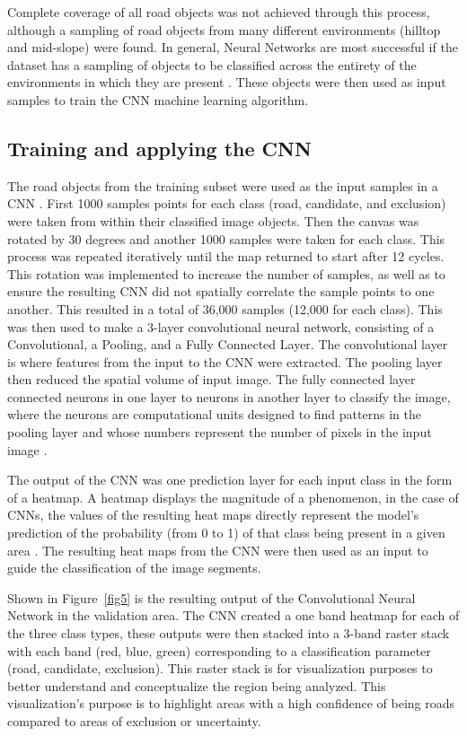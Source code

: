 \documentclass[remotesensing,article,submit,pdftex,moreauthors]{Definitions/mdpi}
\begin{document}
Complete coverage of all road objects was not achieved through this process, although a sampling of road objects from many different environments (hilltop and mid-slope) were found.  In general, Neural Networks are most successful if the dataset has a sampling of objects to be classified across the entirety of the environments in which they are present \cite{prakash}. These objects were then used as input samples to train the CNN machine learning algorithm.  

\subsection{Training and applying the CNN}
The road objects from the training subset were used as the input samples in a CNN \cite{ecogcnn}. First 1000 samples points for each class (road, candidate, and exclusion) were taken from within their classified image objects. Then the canvas was rotated by 30 degrees and another 1000 samples were taken for each class. This process was repeated iteratively until the map returned to start after 12 cycles. This rotation was implemented to increase the number of samples, as well as to ensure the resulting CNN did not spatially correlate the sample points to one another. This resulted in a total of 36,000 samples (12,000 for each class). This was then used to make a 3-layer convolutional neural network, consisting of a Convolutional, a Pooling, and a Fully Connected Layer. The convolutional layer is where features from the input to the CNN were extracted. The pooling layer then reduced the spatial volume of input image. The fully connected layer connected neurons in one layer to neurons in another layer to classify the image, where the neurons are computational units designed to find patterns in the pooling layer and whose numbers represent the number of pixels in the input image \cite{prakash}.

The output of the CNN was one prediction layer for each input class in the form of a heatmap. A heatmap displays the magnitude of a phenomenon, in the case of CNNs, the values of the resulting heat maps directly represent the model’s prediction of the probability (from 0 to 1) of that class being present in a given area \cite{prakash, timilsina}. The resulting heat maps from the CNN were then used as an input to guide the classification of the image segments.
 
Shown in Figure~\ref{fig5} is the resulting output of the Convolutional Neural Network in the validation area. The CNN created a one band heatmap for each of the three class types, these outputs were then stacked into a 3-band raster stack with each band (red, blue, green) corresponding to a classification parameter (road, candidate, exclusion). This raster stack is for visualization purposes to better understand and conceptualize the region being analyzed. This visualization’s purpose is to highlight areas with a high confidence of being roads compared to areas of exclusion or uncertainty.
\end{document}
